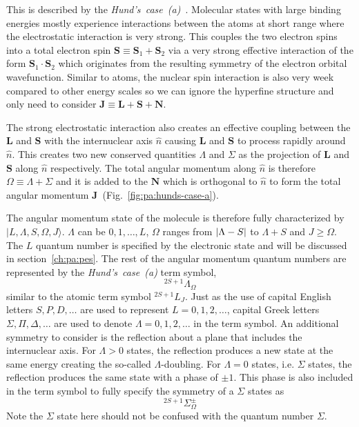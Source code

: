 This is described by the \textit{Hund's~case~(a)}~\cite[p.~523-626]{bransden_physics_2003}.
Molecular states with large binding energies mostly experience interactions
between the atoms at short range where the electrostatic interaction is very strong.
This couples the two electron spins into a total electron spin
$\mathbf{S}\equiv\mathbf{S}_1+\mathbf{S}_2$ via a very strong effective interaction
of the form $\mathbf{S}_1\cdot\mathbf{S}_2$ which originates
from the resulting symmetry of the electron orbital wavefunction.
Similar to atoms, the nuclear spin interaction is also very week compared to
other energy scales so we can ignore the hyperfine structure and only need to consider
$\mathbf{J}\equiv\mathbf{L}+\mathbf{S}+\mathbf{N}$.

The strong electrostatic interaction also creates an effective coupling
between the $\mathbf{L}$ and $\mathbf{S}$ with the internuclear axis $\hat{n}$
causing $\mathbf{L}$ and $\mathbf{S}$ to process rapidly around $\hat{n}$.
This creates two new conserved quantities $\Lambda$ and $\Sigma$
as the projection of $\mathbf{L}$ and $\mathbf{S}$
along $\hat{n}$ respectively.
The total angular momentum along $\hat{n}$ is therefore $\Omega\equiv\Lambda+\Sigma$
and it is added to the $\mathbf{N}$ which is orthogonal to $\hat{n}$ to form
the total angular momentum $\mathbf{J}$~(Fig.~\ref{fig:pa:hunds-case-a}).

The angular momentum state of the molecule is therefore fully characterized by
$|L,\Lambda,S,\Omega,J\rangle$. $\Lambda$ can be $0,1,\dots,L$, $\Omega$ ranges from
${\left|{\Lambda-S}\right|}$ to $\Lambda+S$ and $J\geqslant\Omega$.
The $L$ quantum number is specified by the electronic state and will be discussed
in section~\ref{ch:pa:pes}. The rest of the angular momentum quantum numbers
are represented by the \textit{Hund's~case~(a)} term symbol,
\[ ^{2S+1}\Lambda_\Omega \]
similar to the atomic term symbol $^{2S+1}L_J$.
Just as the use of capital English letters $S,P,D,\dots$ are used to represent
$L=0,1,2,\dots$, capital Greek letters $\Sigma,\Pi,\Delta,\dots$ are used
to denote $\Lambda=0,1,2,\dots$ in the term symbol.
An additional symmetry to consider is the reflection about a plane that includes
the internuclear axis.
For $\Lambda>0$ states, the reflection produces a new state at the same energy
creating the so-called $\Lambda$-doubling. For $\Lambda=0$ states, i.e. $\Sigma$ states,
the reflection produces the same state with a phase of $\pm1$.
This phase is also included in the term symbol to fully specify the symmetry of
a $\Sigma$ states as
\[ ^{2S+1}\Sigma_\Omega^{\pm} \]
Note the $\Sigma$ state here should not be confused with the quantum number $\Sigma$.

